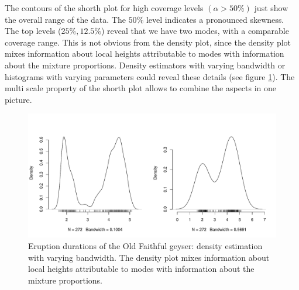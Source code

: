 \documentclass[dvips,12pt,a4paper,twoside]{amsart}
\newcommand{\gsnote}[1]{}
\newcommand{\gsnote}[1]{\marginpar{\textcolor{green}{#1}}}%
\begin{document}
The contours of the shorth plot for high coverage levels $(\alpha > 50\%)$ just show the overall 
range of the data. The $50\%$ level indicates a pronounced skewness. The top levels 
($25\%, 12.5\%$) reveal 
that we have two modes, with a comparable coverage range. This is not obvious from 
the density plot, since the density plot mixes information about local heights attributable 
to modes with information about the mixture proportions.\gsnote{figure added to illustrate this} Density estimators with varying bandwidth or histograms with varying parameters could reveal these details (see figure \ref{fig:faithfuldensadj}). The multi scale property of the shorth plot allows to combine the aspects in one picture.
\begin{figure}[htb]
\includegraphics[width=0.95\linewidth]{TheShorthPlot-Faithfuldensadj}
\caption{Eruption durations of the Old Faithful geyser:  density estimation with varying bandwidth. The density plot mixes information about local heights attributable 
to modes with information about the mixture proportions. }\label{fig:faithfuldensadj}
\end{figure}

%
%
\end{document}
